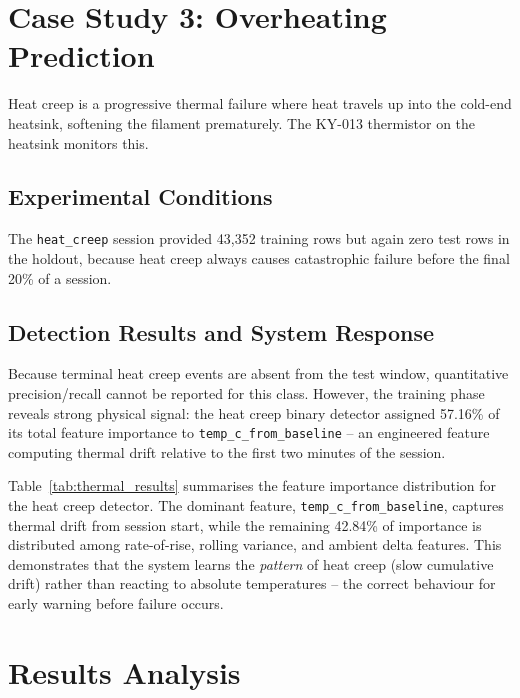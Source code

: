 \section{Case Study 3: Overheating Prediction}
\label{sec:cs3}

Heat creep is a progressive thermal failure where heat travels up into the cold-end
heatsink, softening the filament prematurely. The KY-013 thermistor on the heatsink
monitors this.

\subsection{Experimental Conditions}

The \texttt{heat\_creep} session provided 43,352 training rows but again zero test rows in
the holdout, because heat creep always causes catastrophic failure before the final 20\%
of a session.

\subsection{Detection Results and System Response}

Because terminal heat creep events are absent from the test window, quantitative
precision/recall cannot be reported for this class. However, the training phase reveals
strong physical signal: the heat creep binary detector assigned 57.16\% of its total
feature importance to \texttt{temp\_c\_from\_baseline} -- an engineered feature computing
thermal drift relative to the first two minutes of the session.

Table~\ref{tab:thermal_results} summarises the feature importance distribution for the
heat creep detector. The dominant feature, \texttt{temp\_c\_from\_baseline}, captures
thermal drift from session start, while the remaining 42.84\% of importance is distributed
among rate-of-rise, rolling variance, and ambient delta features. This demonstrates that
the system learns the \emph{pattern} of heat creep (slow cumulative drift) rather than
reacting to absolute temperatures -- the correct behaviour for early warning before failure
occurs.

\begin{table}[H]
\centering
\caption{Heat creep binary detector -- training-phase feature importance}
\label{tab:thermal_results}

\end{table}

\section{Results Analysis}
\label{sec:results_analysis}

